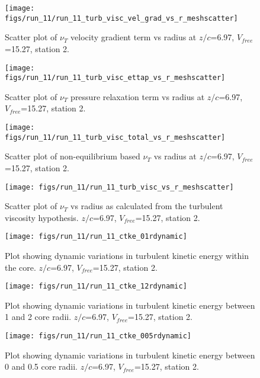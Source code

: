 \begin{figure}[H]
\centering
\texttt{[image: figs/run\_11/run\_11\_turb\_visc\_vel\_grad\_vs\_r\_meshscatter]}
\caption{Scatter plot of $\nu_T$ velocity gradient term vs radius at $z/c$=6.97, $V_{free}$=15.27, station 2.}
\end{figure}


\begin{figure}[H]
\centering
\texttt{[image: figs/run\_11/run\_11\_turb\_visc\_ettap\_vs\_r\_meshscatter]}
\caption{Scatter plot of $\nu_T$ pressure relaxation term vs radius at $z/c$=6.97, $V_{free}$=15.27, station 2.}
\end{figure}


\begin{figure}[H]
\centering
\texttt{[image: figs/run\_11/run\_11\_turb\_visc\_total\_vs\_r\_meshscatter]}
\caption{Scatter plot of non-equilibrium based $\nu_T$ vs radius at $z/c$=6.97, $V_{free}$=15.27, station 2.}
\end{figure}


\begin{figure}[H]
\centering
\texttt{[image: figs/run\_11/run\_11\_turb\_visc\_vs\_r\_meshscatter]}
\caption{Scatter plot of $\nu_T$ vs radius as calculated from the turbulent viscosity hypothesis. $z/c$=6.97, $V_{free}$=15.27, station 2.}
\end{figure}


\begin{figure}[H]
\centering
\texttt{[image: figs/run\_11/run\_11\_ctke\_01rdynamic]}
\caption{Plot showing dynamic variations in turbulent kinetic energy within the core. $z/c$=6.97, $V_{free}$=15.27, station 2.}
\end{figure}


\begin{figure}[H]
\centering
\texttt{[image: figs/run\_11/run\_11\_ctke\_12rdynamic]}
\caption{Plot showing dynamic variations in turbulent kinetic energy between 1 and 2 core radii. $z/c$=6.97, $V_{free}$=15.27, station 2.}
\end{figure}


\begin{figure}[H]
\centering
\texttt{[image: figs/run\_11/run\_11\_ctke\_005rdynamic]}
\caption{Plot showing dynamic variations in turbulent kinetic energy between 0 and 0.5 core radii. $z/c$=6.97, $V_{free}$=15.27, station 2.}
\end{figure}


